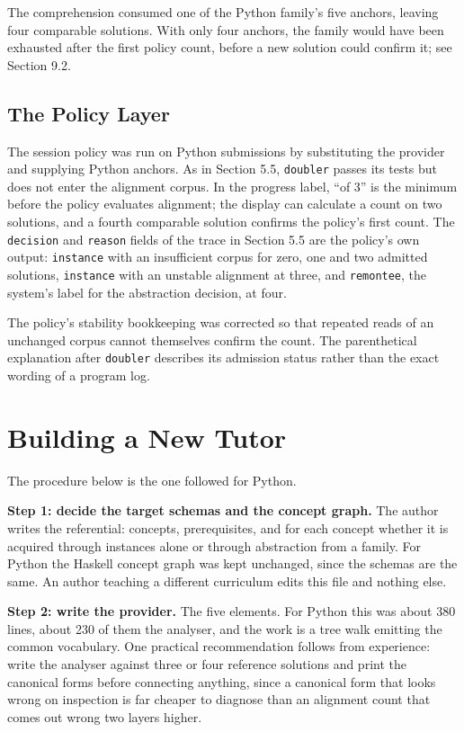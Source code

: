 \documentclass[10pt,twocolumn,letterpaper]{article}
\begin{document}
The comprehension consumed one of the Python family's five anchors,
leaving four comparable solutions. With only four anchors, the family
would have been exhausted after the first policy count, before a new
solution could confirm it; see Section 9.2.

\subsection{The Policy Layer}
The session policy was run on Python submissions by substituting the
provider and supplying Python anchors. As in Section 5.5, \texttt{doubler}
passes its tests but does not enter the alignment corpus. In the progress
label, ``of 3'' is the minimum before the policy evaluates alignment;
the display can calculate a count on two solutions, and a fourth
comparable solution confirms the policy's first count. The
\texttt{decision} and \texttt{reason} fields of the trace in Section 5.5 are
the policy's own output: \texttt{instance} with an insufficient corpus for
zero, one and two admitted solutions, \texttt{instance} with an unstable
alignment at three, and \texttt{remontee}, the system's label for the
abstraction decision, at four.



The policy's stability bookkeeping was corrected so that repeated reads
of an unchanged corpus cannot themselves confirm the count. The
parenthetical explanation after \texttt{doubler} describes its admission
status rather than the exact wording of a program log.

\section{Building a New Tutor}
The procedure below is the one followed for Python.

\textbf{Step 1: decide the target schemas and the concept graph.} The author writes the referential: concepts, prerequisites, and for each concept whether it is acquired through instances alone or through abstraction from a family. For Python the Haskell concept graph was kept unchanged, since the schemas are the same. An author teaching a different curriculum edits this file and nothing else.

\textbf{Step 2: write the provider.} The five elements. For Python this was about 380 lines, about 230 of them the analyser, and the work is a tree walk emitting the common vocabulary. One practical recommendation follows from experience: write the analyser against three or four reference solutions and print the canonical forms before connecting anything, since a canonical form that looks wrong on inspection is far cheaper to diagnose than an alignment count that comes out wrong two layers higher.
\end{document}
